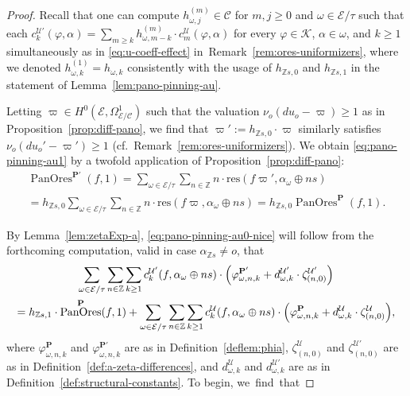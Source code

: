 \documentclass[10pt,a4paper]{amsart}
\DeclareMathOperator{\pano}{PanOres}
\newcommand{\Ca}{\mathcal{C}} %
\newcommand{\Z}{\mathbb{Z}} %
\newcommand{\bk}{\mathcal{K}} %
\newcommand{\ec}{\mathcal{E}} %
\newcommand{\idec}{{o}} %
\newcommand{\orbita}{{\ec/\tau}} %
\newcommand{\za}[2]{\zeta^{\mathcal{U}}_{( {#1} , {#2} )}}
\begin{document}
\begin{proof} Recall that one can compute $h^{(m)}_{\omega,j}\in\Ca$ for $m,j\geq 0$ and $\omega\in\orbita$ such that each $c_k^{\mathcal{U}'}(\varphi,\alpha)=\sum_{m\geq k}h^{(m)}_{\omega,m-k}\cdot c_m^{\mathcal{U}}(\varphi,\alpha)$ for every $\varphi\in\bk$, $\alpha\in \omega$, and $k\geq 1$ simultaneously as in \eqref{eq:u-coeff-effect} in~Remark~\ref{rem:ores-uniformizers}, where we denoted $h^{(1)}_{\omega,k}=h_{\omega,k}$ consistently with the usage of $h_{\Z s,0}$ and $h_{\Z s,1}$ in the statement of Lemma~\ref{lem:pano-pinning-au}.

Letting $\varpi\in H^0(\ec,\Omega^1_{\ec/\Ca})$ such that the valuation $\nu_\idec(du_\idec-\varpi)\geq 1$ as in Proposition~\ref{prop:diff-pano}, we find that $\varpi':=h_{\Z s,0}\cdot\varpi$ similarly satisfies $\nu_\idec(du_\idec'-\varpi')\geq 1$ (cf.~Remark~\ref{rem:ores-uniformizers}). We obtain \eqref{eq:pano-pinning-au1} by a twofold application of Proposition~\ref{prop:diff-pano}:
\begin{multline*}\pano^{\mathbf{P}'}(f,1)=\sum_{\omega\in\orbita}\sum_{n\in\Z}n\cdot\mathrm{res}(f\varpi',\alpha_\omega\oplus ns)\\=h_{\Z s,0}\sum_{\omega\in\orbita}\sum_{n\in\Z}n\cdot\mathrm{res}(f\varpi,\alpha_\omega\oplus ns)=h_{\Z s,0}\pano^\mathbf{P}(f,1).\end{multline*}
    
 By Lemma~\ref{lem:zetaExp-a}, \eqref{eq:pano-pinning-au0-nice} will follow from the forthcoming computation, valid in case $\alpha_{\Z s}\neq \idec$, that \begin{gather}\label{eq:pano-pinning-au0-proof} \sum_{\omega\in\orbita}\sum_{n\in\Z}\sum_{k\geq 1}c^{\mathcal{U}'}_k(f,\alpha_\omega\oplus ns)\cdot\Bigl(\varphi^{\mathbf{P}'}_{\omega,n,k}+d^{\mathcal{U}'}_{\omega,k}\cdot\zeta^{\mathcal{U}'}_{(n,0)}\Bigr)\\ =h_{\Z s,1}\cdot\pano^\mathbf{P}(f,1)+\sum_{\omega\in\orbita}\sum_{n\in\Z}\sum_{k\geq 1}c^{\mathcal{U}}_k(f,\alpha_\omega\oplus ns)\cdot\Bigl(\varphi^{\mathbf{P}}_{\omega,n,k}+d^{\mathcal{U}}_{\omega,k}\cdot\zeta^{\mathcal{U}}_{(n,0)}\Bigr),\notag\end{gather} where $\varphi_{\omega,n,k}^{\mathbf{P}}$ and $\varphi_{\omega,n,k}^{\mathbf{P}'}$ are as in Definition~\ref{deflem:phia}, $\za{n}{0}$ and $\zeta^{\mathcal{U}'}_{(n,0)}$ are as in Definition~\ref{def:a-zeta-differences}, and $d^\mathcal{U}_{\omega,k}$ and $d^{\mathcal{U}'}_{\omega,k}$ are as in Definition~\ref{def:structural-constants}. To begin, \mbox{we find that}
 

\end{proof}
\end{document}
